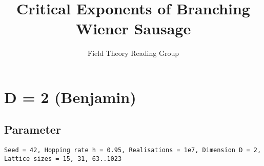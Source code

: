 \documentclass[10pt,a4paper]{article}
\title{Critical Exponents of Branching Wiener Sausage}
\author{Field Theory Reading Group}
\theoremstyle{definition}
\theoremstyle{plain}
\begin{document}
\maketitle
\section{D = 2 (Benjamin)}
\subsection*{Parameter}
\texttt{Seed = 42, Hopping rate h = 0.95, Realisations = 1e7, Dimension D = 2, Lattice sizes = 15, 31, 63..1023}
\end{document}
